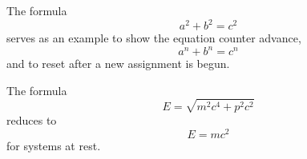 \documentclass[english]{assignmentsheet}
\author{Author Name}
\begin{document}
\maketitle

\lipsum[1]
The formula
\begin{equation}
  a^2+b^2=c^2
\end{equation}
serves as an example to show the equation counter advance,
\begin{equation}
  a^n+b^n=c^n
\end{equation}
and to reset after a new assignment is begun.


\assignment{}
\lipsum[2]
The formula
\begin{equation}
  E=\sqrt{m^2c^4+p^2c^2}
\end{equation}
reduces to
\begin{equation}
  E=mc^2
\end{equation}
for systems at rest.
\lipsum[3]
\end{document}
